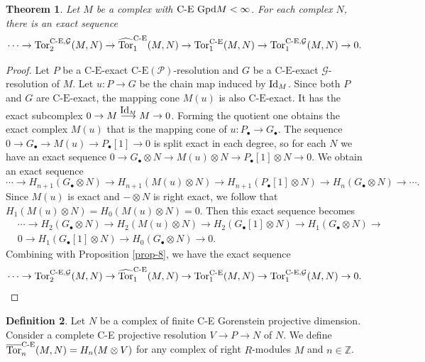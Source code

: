 \documentclass[reqno,12pt]{amsart}
\numberwithin{equation}{section}
\theoremstyle{plain}
\newtheorem{theorem}{\bf Theorem}[section]
\theoremstyle{definition}
\newtheorem{definition}[theorem]{\bf Definition}
\newcommand{\CE}{\mathrm{C}\text{-}\mathrm{E}}
\begin{document}
\begin{theorem}\label{thm-3}
    Let $M$ be a complex with $\text{\rm C-E Gpd}M<\infty$. For each complex $N$, there is an exact sequence $$\cdots\to \Tor^{\CE,\mathcal{G}}_2(M,N)\to \widehat{\Tor}_1^{\CE}(M,N) \to \Tor_1^{\CE}(M,N)\to \Tor^{\CE,\mathcal{G}}_1(M,N)\to 0.$$
\end{theorem}
\begin{proof}
    Let $P$ be a $\CE$-exact $\text{C-E}(\mathcal{P})$-resolution and $G$ be a $\CE$-exact $\mathcal{G}$-resolution of $M$. Let $u:P\to G$ be the chain map induced by $\mbox{\rm Id}_M$. Since both $P$ and $G$ are $\CE$-exact, the mapping cone $M(u)$ is also $\CE$-exact. It has the exact subcomplex $0\to M\stackrel{\mbox{\rm Id}_M}\longrightarrow M\to 0$. Forming the quotient one obtains the exact complex $M(u)$ that is the mapping cone of $u:P_{\bullet}\to G_{\bullet}$. The sequence $0\to G_{\bullet}\to M(u)\to P_{\bullet}[1]\to 0$ is split exact in each degree, so for each $N$ we have an exact sequence $0\to G_{\bullet}\otimes N\to M(u)\otimes N\to P_{\bullet}[1]\otimes N\to 0$. We obtain an exact sequence $$\cdots \to H_{n+1}(G_{\bullet}\otimes N)\to H_{n+1}(M(u)\otimes N)\to H_{n+1}(P_{\bullet}[1]\otimes N)\to H_n(G_{\bullet}\otimes N)\to\cdots.
    $$ Since $M(u)$ is exact and $-\otimes N$ is right exact, we follow that $H_1(M(u)\otimes N)=H_0(M(u)\otimes N)=0$. Then this exact sequence becomes
    \begin{align*}
            & \cdots \to H_{2}(G_{\bullet}\otimes N)\to H_{2}(M(u)\otimes N)\to H_{2}(G_{\bullet}[1]\otimes N)\to H_1(G_{\bullet}\otimes N)\to\\
            & 0 \to H_1(G_{\bullet}[1]\otimes N)\to H_0(G_{\bullet}\otimes N)\to 0.
    \end{align*}
    Combining with Proposition \ref{prop-8}, we have the exact sequence $$\cdots\to \mbox{\rm Tor}^{\text{C-E},\mathcal{G}}_2(M,N)\to \widehat{\mbox{\rm Tor}}_1^{\text{C-E}}(M,N) \to \mbox{\rm Tor}_1^{\text{C-E}}(M,N)\to \mbox{\rm Tor}^{\text{C-E},\mathcal{G}}_1(M,N)\to 0.$$
\end{proof}

\begin{definition}
    Let $N$ be a complex of finite C-E Gorenstein projective dimension. Consider a complete C-E projective resolution $V\to P\to N$ of $N$. We define $\overline{\mbox{\rm Tor}}_n^{\text{C-E}}(M,N)=H_n(M\otimes V)$ for any complex of right $R$-modules $M$ and $n\in\mathbb{Z}$.
\end{definition}
\end{document}
